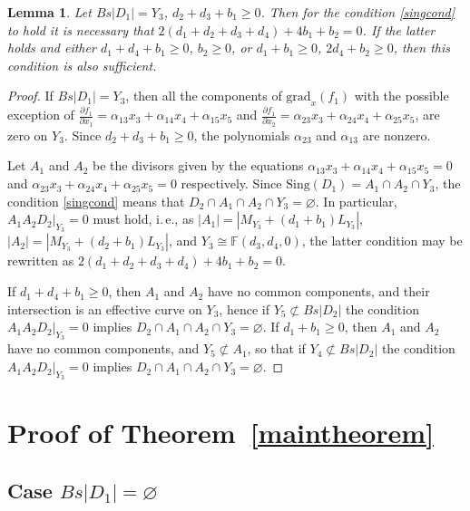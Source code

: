 \documentclass[12pt]{amsart}
\newtheorem{lemma}[equation]{Lemma}
\theoremstyle{definition}
\theoremstyle{remark}
\begin{document}
\begin{lemma}\label{lemma:Y3-sing}
Let $Bs|D_1|=Y_3$, $d_2+d_3+b_1\geqslant 0$. Then for the condition 
\ref{singcond} to hold it is necessary that $2(d_1+d_2+d_3+d_4)+4b_1+b_2=0$. 
If the latter holds and either $d_1+d_4+b_1\geqslant 0$, $b_2\geqslant 0$, or 
$d_1+b_1\geqslant 0$,
$2d_4+b_2\geqslant 0$, then this condition is also sufficient.
\end{lemma}
\begin{proof}
If $Bs|D_1|=Y_3$, then all the components of ${\mathrm{grad}_x}(f_1)$ with the possible exception of
$\frac{\partial f_1}{\partial x_1}=\alpha_{13}x_3+\alpha_{14}x_4+\alpha_{15}x_5$ and
$\frac{\partial f_1}{\partial x_2}=\alpha_{23}x_3+\alpha_{24}x_4+\alpha_{25}x_5$, are zero on $Y_3$. Since $d_2+d_3+b_1\geqslant 0$, the polynomials 
$\alpha_{23}$ and $\alpha_{13}$ are nonzero.

Let $A_1$ and $A_2$ be the divisors given by the equations 
$\alpha_{13}x_3+\alpha_{14}x_4+\alpha_{15}x_5=0$
and $\alpha_{23}x_3+\alpha_{24}x_4+\alpha_{25}x_5=0$ respectively. Since
${\mathrm{Sing}}(D_1)=A_1\cap A_2\cap Y_3$, the condition \ref{singcond} 
means that  
$D_2\cap A_1\cap A_2\cap Y_3=\varnothing$. 
In particular,  $A_1A_2D_2\vert_{Y_3}=0$ must hold, i.\,e., as 
$|A_1|=|M_{Y_3}+(d_1+b_1)L_{Y_3}|$, $|A_2|=|M_{Y_3}+(d_2+b_1)L_{Y_3}|$, and 
$Y_3\cong{\mathbb{F}}(d_3, d_4, 0)$, the latter condition may be rewritten as
$2(d_1+d_2+d_3+d_4)+4b_1+b_2=0$. 

If $d_1+d_4+b_1\geqslant 0$, then $A_1$ and $A_2$ have no common components, 
and their intersection is an effective curve on $Y_3$, 
hence if $Y_5\not\subset Bs|D_2|$ the condition $A_1A_2D_2\vert_{Y_3}=0$ 
implies $D_2\cap A_1\cap A_2\cap Y_3=\varnothing$. 
If $d_1+b_1\geqslant 0$, then $A_1$ and $A_2$ have no common components, 
and $Y_5\not\subset A_1$, so that if $Y_4\not\subset Bs|D_2|$ the condition
$A_1A_2D_2\vert_{Y_3}=0$ implies $D_2\cap A_1\cap A_2\cap Y_3=\varnothing$.
\end{proof}

\section{Proof of Theorem~\ref{maintheorem}}\label{proofofmaintheorem}

\subsection{Case $Bs|D_1|=\varnothing$}
\end{document}
